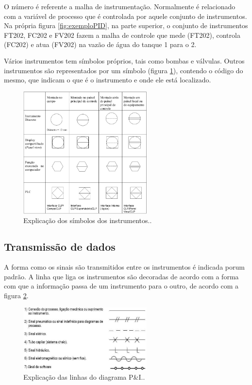 O número é referente a malha de instrumentação. Normalmente é relacionado com a variável de processo que é controlada por aquele conjunto de instrumentos. Na própria figura \ref{fig:exemploPID}, na parte superior, o conjunto de instrumentos FT202, FC202 e FV202 fazem a malha de controle que mede (FT202), controla (FC202) e atua (FV202) na vazão de água do tanque 1 para o 2.

Vários instrumentos tem símbolos próprios, tais como bombas e válvulas. Outros instrumentos são representados por um símbolo (figura \ref{fig:simbolosISA}), contendo o código do mesmo, que indicam o que é o instrumento e onde ele está localizado.
\begin{figure}[h]
  \centering
  \includegraphics[width = 0.6\textwidth]{figuras/simbolosISA}
  \caption{Explicação dos símbolos dos instrumentos.\label{fig:simbolosISA}.}
\end{figure}

\subsection{Transmissão de dados}
\label{sub:TransmissaoDeDados}

A forma como os sinais são transmitidos entre os instrumentos é indicada porum padrão. A linha que liga os instrumentos são decoradas de acordo com a forma com que a informação passa de um instrumento para o outro, de acordo com a figura \ref{fig:linhasISA}.
\begin{figure}[h]
  \centering
  \includegraphics[width = 0.6\textwidth]{figuras/linhasISA}
  \caption{Explicação das linhas do diagrama P\&I.\label{fig:linhasISA}.}
\end{figure}

